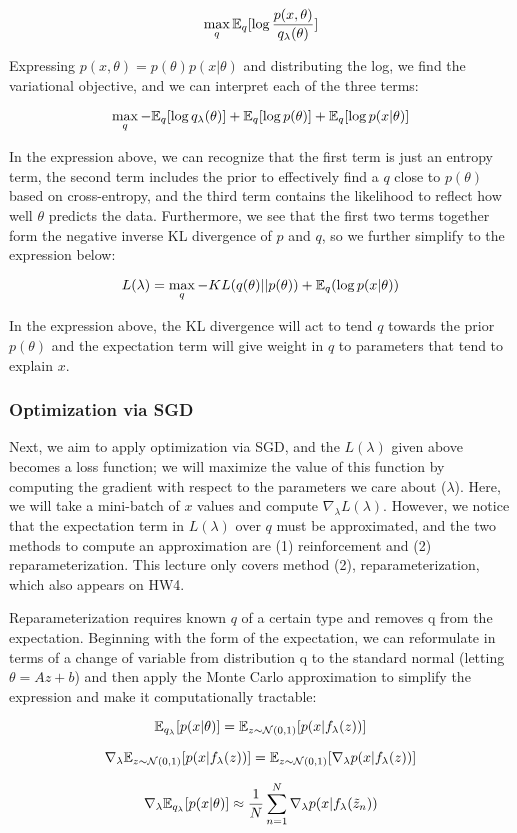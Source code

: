 \documentclass{article}
\begin{document}
$$
\max_{q} \mathbb{E}_q [\log{\frac{p(x, \theta)}{q_{\lambda}(\theta)}} ]
$$

Expressing $p(x, \theta) = p(\theta) p(x|\theta)$ and distributing the log, we find the variational objective, and we can interpret each of the three terms:

$$
\max_{q} - \mathbb{E}_q [\log{q_{\lambda}(\theta)} ] + \mathbb{E}_q [\log{p(\theta)} ] + \mathbb{E}_q [\log{p(x|\theta)} ]
$$

In the expression above, we can recognize that the first term is just an entropy term, the second term includes the prior to effectively find a $q$ close to $p(\theta)$ based on cross-entropy, and the third term contains the likelihood to reflect how well $\theta$ predicts the data.  
Furthermore, we see that the first two terms together form the negative inverse KL divergence of $p$ and $q$, so we further simplify to the expression below:

$$
L(\lambda) = \max_{q} - KL(q(\theta) || p(\theta)) + \mathbb{E}_q (\log{p(x|\theta)})
$$

In the expression above, the KL divergence will act to tend $q$ towards the prior $p(\theta)$ and the expectation term will give weight in $q$ to parameters that tend to explain $x$.

\subsubsection{Optimization via SGD}

Next, we aim to apply optimization via SGD, and the $L(\lambda)$ given above becomes a loss function; we will maximize the value of this function by computing the gradient with respect to the parameters we care about ($\lambda$).  
Here, we will take a mini-batch of $x$ values and compute $\nabla_{\lambda} L(\lambda)$.  
However, we notice that the expectation term in $L(\lambda)$ over $q$ must be approximated, and the two methods to compute an approximation are (1) reinforcement and (2) reparameterization.
This lecture only covers method (2), reparameterization, which also appears on HW4.

Reparameterization requires known $q$ of a certain type and removes q from the expectation.  
Beginning with the form of the expectation, we can reformulate in terms of a change of variable from distribution q to the standard normal (letting $\theta = Az+b$) and then apply the Monte Carlo approximation to simplify the expression and make it computationally tractable:

$$
\mathbb{E}_{q_{\lambda}} [p(x|\theta)] = \mathbb{E}_{z \sim \mathcal{N}(0,1)} [p(x|f_{\lambda}(z))]
$$

$$
\nabla_{\lambda} \mathbb{E}_{z \sim \mathcal{N}(0,1)} [p(x|f_{\lambda}(z))] = \mathbb{E}_{z \sim \mathcal{N}(0,1)} [ \nabla_{\lambda} p(x|f_{\lambda}(z))]
$$

$$
\nabla_{\lambda} \mathbb{E}_{q_{\lambda}} [p(x|\theta)] \approx \frac{1}{N} \sum_{n=1}^{N} \nabla_{\lambda} p(x|f_{\lambda}(\tilde{z}_n))
$$
\end{document}
